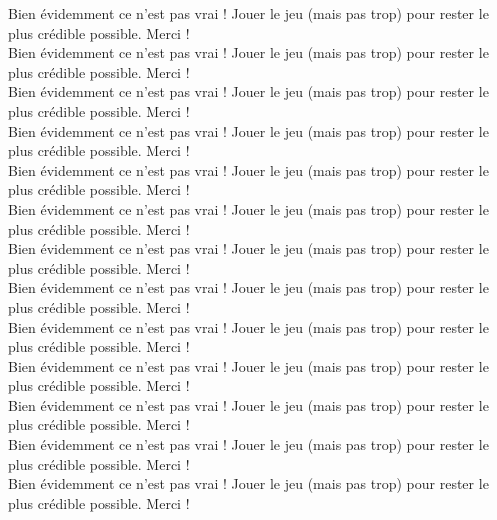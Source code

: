 \documentclass[10pt]{article}
\begin{document}
\setlength{\columnseprule}{1pt}

\begin{multicols}{2}
Bien évidemment ce n'est pas vrai ! Jouer le jeu (mais pas trop) pour rester le plus crédible possible. Merci !\\

Bien évidemment ce n'est pas vrai ! Jouer le jeu (mais pas trop) pour rester le plus crédible possible. Merci !\\

Bien évidemment ce n'est pas vrai ! Jouer le jeu (mais pas trop) pour rester le plus crédible possible. Merci !\\

Bien évidemment ce n'est pas vrai ! Jouer le jeu (mais pas trop) pour rester le plus crédible possible. Merci !\\

Bien évidemment ce n'est pas vrai ! Jouer le jeu (mais pas trop) pour rester le plus crédible possible. Merci !\\

Bien évidemment ce n'est pas vrai ! Jouer le jeu (mais pas trop) pour rester le plus crédible possible. Merci !\\

Bien évidemment ce n'est pas vrai ! Jouer le jeu (mais pas trop) pour rester le plus crédible possible. Merci !\\

Bien évidemment ce n'est pas vrai ! Jouer le jeu (mais pas trop) pour rester le plus crédible possible. Merci !\\

Bien évidemment ce n'est pas vrai ! Jouer le jeu (mais pas trop) pour rester le plus crédible possible. Merci !\\

Bien évidemment ce n'est pas vrai ! Jouer le jeu (mais pas trop) pour rester le plus crédible possible. Merci !\\

Bien évidemment ce n'est pas vrai ! Jouer le jeu (mais pas trop) pour rester le plus crédible possible. Merci !\\

Bien évidemment ce n'est pas vrai ! Jouer le jeu (mais pas trop) pour rester le plus crédible possible. Merci !\\

Bien évidemment ce n'est pas vrai ! Jouer le jeu (mais pas trop) pour rester le plus crédible possible. Merci !\\


\end{multicols}
\end{document}
